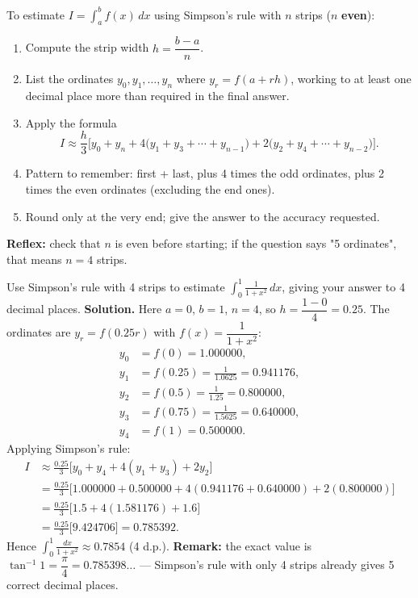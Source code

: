 \documentclass[11pt]{article}
\newcommand{\cle}[1]{{\popxbold\color{popdark}#1}}
\begin{document}
\begin{methode}
To estimate $\displaystyle I=\int_a^b f(x)\,dx$ using Simpson's rule with $n$ strips ($n$ \textbf{even}):
\begin{enumerate}
\item Compute the strip width $h=\dfrac{b-a}{n}$.
\item List the ordinates $y_0,y_1,\dots,y_n$ where $y_r=f(a+rh)$, working to at least one decimal place more than required in the final answer.
\item Apply the formula
\[ I\approx \frac{h}{3}\Big[y_0+y_n+4\big(y_1+y_3+\cdots+y_{n-1}\big)+2\big(y_2+y_4+\cdots+y_{n-2}\big)\Big]. \]
\item Pattern to remember: \cle{first + last}, plus \cle{4 times the odd} ordinates, plus \cle{2 times the even} ordinates (excluding the end ones).
\item Round only at the very end; give the answer to the accuracy requested.
\end{enumerate}
\textbf{Reflex:} check that $n$ is even before starting; if the question says "5 ordinates", that means $n=4$ strips.
\end{methode}

\begin{exoresolu}
Use Simpson's rule with 4 strips to estimate $\displaystyle\int_0^1 \frac{1}{1+x^2}\,dx$, giving your answer to 4 decimal places.
\tcblower
\textbf{Solution.} Here $a=0$, $b=1$, $n=4$, so $h=\dfrac{1-0}{4}=0.25$. The ordinates are $y_r=f(0.25r)$ with $f(x)=\dfrac{1}{1+x^2}$:
\begin{align*}
y_0 &= f(0) = 1.000000,\\
y_1 &= f(0.25) = \frac{1}{1.0625} = 0.941176,\\
y_2 &= f(0.5) = \frac{1}{1.25} = 0.800000,\\
y_3 &= f(0.75) = \frac{1}{1.5625} = 0.640000,\\
y_4 &= f(1) = 0.500000.
\end{align*}
Applying Simpson's rule:
\begin{align*}
I &\approx \frac{0.25}{3}\Big[y_0+y_4+4(y_1+y_3)+2y_2\Big]\\
&= \frac{0.25}{3}\Big[1.000000+0.500000+4(0.941176+0.640000)+2(0.800000)\Big]\\
&= \frac{0.25}{3}\Big[1.5+4(1.581176)+1.6\Big]\\
&= \frac{0.25}{3}\big[9.424706\big] = 0.785392.
\end{align*}
Hence $\displaystyle\int_0^1\frac{dx}{1+x^2}\approx 0.7854$ (4 d.p.).
\textbf{Remark:} the exact value is $\tan^{-1}1=\dfrac{\pi}{4}=0.785398\ldots$ — Simpson's rule with only 4 strips already gives 5 correct decimal places.
\end{exoresolu}
\end{document}
